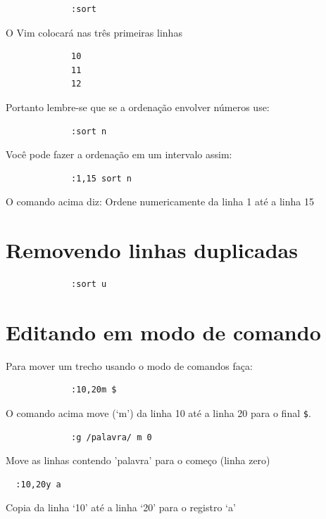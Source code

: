 \documentclass[10pt,a4paper,openany]{book}
\begin{document}
\begin{verbatim}
			 :sort
\end{verbatim}

O Vim colocará nas três primeiras linhas

\begin{verbatim}
			 10
			 11
			 12
\end{verbatim}

Portanto lembre-se que se a ordenação envolver números use:

\begin{verbatim}
			 :sort n
\end{verbatim}

Você pode fazer a ordenação em um intervalo assim:

\begin{verbatim}
			 :1,15 sort n
\end{verbatim}

O comando acima diz: Ordene numericamente da linha 1 até a linha 15

\section{Removendo linhas duplicadas}

\begin{verbatim}
			 :sort u
\end{verbatim}


\section{Editando em modo de comando}\label{sec:Editando em modo de comando}

Para mover um trecho usando o modo de comandos faça:

\begin{verbatim}
			 :10,20m $
\end{verbatim}

O comando acima move (`m') da linha 10 até a linha 20 para o final \verb|$|.

\begin{verbatim}
			 :g /palavra/ m 0
\end{verbatim}

Move as linhas contendo 'palavra' para o começo (linha zero)


\begin{verbatim}
  :10,20y a
\end{verbatim}

Copia da linha `10' até a linha `20' para o registro `a'
\end{document}
